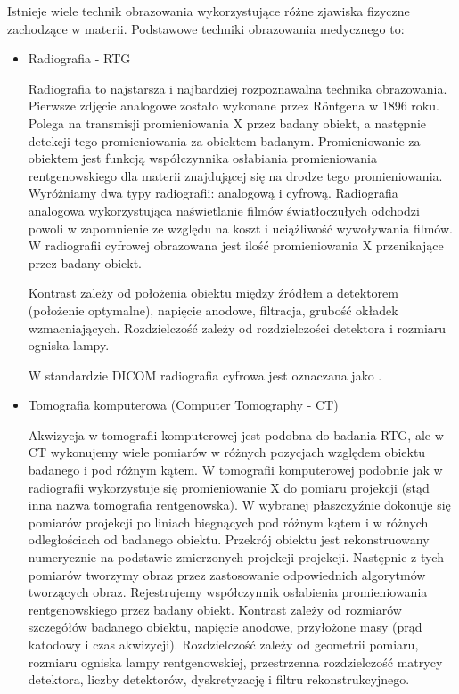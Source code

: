 Istnieje wiele technik obrazowania wykorzystujące różne zjawiska fizyczne zachodzące w materii.
Podstawowe techniki obrazowania medycznego to:
\label{sec:basic-imaging-technics}
\begin{itemize}
    \item Radiografia - RTG

    Radiografia to najstarsza i najbardziej rozpoznawalna technika obrazowania.
    Pierwsze zdjęcie analogowe zostało wykonane przez Röntgena w 1896 roku.
    Polega na transmisji promieniowania X przez badany obiekt, a następnie detekcji tego promieniowania za obiektem badanym.
    Promieniowanie za obiektem jest funkcją współczynnika osłabiania promieniowania rentgenowskiego dla materii znajdującej się na drodze tego promieniowania.
    Wyróżniamy dwa typy radiografii: analogową i cyfrową.
    Radiografia analogowa wykorzystująca naświetlanie filmów światłoczułych odchodzi powoli w zapomnienie ze względu na koszt i uciążliwość wywoływania filmów.
		W radiografii cyfrowej obrazowana jest ilość promieniowania X przenikające przez badany obiekt.
    
		Kontrast zależy od położenia obiektu między źródłem a detektorem (położenie optymalne), napięcie anodowe, filtracja, grubość okładek wzmacniających.
		Rozdzielczość zależy od rozdzielczości detektora i rozmiaru ogniska lampy.
    
    W standardzie DICOM radiografia cyfrowa jest oznaczana jako .

    \item Tomografia komputerowa (Computer Tomography - CT)
    
    Akwizycja w tomografii komputerowej jest podobna do badania RTG, ale w CT wykonujemy wiele pomiarów w różnych pozycjach względem obiektu badanego i pod różnym kątem.
		W tomografii komputerowej podobnie jak w radiografii wykorzystuje się promieniowanie X do pomiaru projekcji (stąd inna nazwa tomografia rentgenowska). W wybranej płaszczyźnie dokonuje się pomiarów projekcji po liniach biegnących pod różnym kątem i w różnych odległościach od badanego obiektu. Przekrój obiektu jest rekonstruowany numerycznie na podstawie zmierzonych projekcji projekcji.
		Następnie z tych pomiarów tworzymy obraz przez zastosowanie odpowiednich algorytmów tworzących obraz.
    Rejestrujemy współczynnik osłabienia promieniowania rentgenowskiego przez badany obiekt.
    Kontrast zależy od rozmiarów szczegółów badanego obiektu, napięcie anodowe, przyłożone masy (prąd katodowy i czas akwizycji).
    Rozdzielczość zależy od geometrii pomiaru, rozmiaru ogniska lampy rentgenowskiej, przestrzenna rozdzielczość matrycy detektora, liczby detektorów, dyskretyzację i filtru rekonstrukcyjnego.


\end{itemize}

